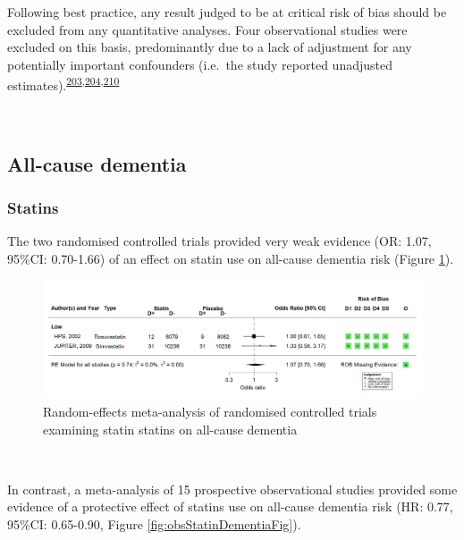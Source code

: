 \documentclass[a4paper, twoside]{templates/ociamthesis}
\begin{document}
Following best practice, any result judged to be at critical risk of bias should be excluded from any quantitative analyses. Four observational studies were excluded on this basis, predominantly due to a lack of adjustment for any potentially important confounders (i.e.~the study reported unadjusted estimates).\textsuperscript{\protect\hyperlink{ref-kuo2015}{203},\protect\hyperlink{ref-mainousa.g.2005}{204},\protect\hyperlink{ref-notkola1998}{210}}

~

\hypertarget{sys-rev-res-Dementia}{%
\subsection{All-cause dementia}\label{sys-rev-res-Dementia}}

\hypertarget{statins}{%
\subsubsection{Statins}\label{statins}}

The two randomised controlled trials provided very weak evidence (OR: 1.07, 95\%CI: 0.70-1.66) of an effect on statin use on all-cause dementia risk (Figure \ref{fig:rctStatinDementiaFig}).





\begin{figure}[H]
\includegraphics[width=1\linewidth]{figures/sys-rev/fp_rct_statins_Dementia} \caption[Random-effects meta-analysis of statins on all-cause dementia]{Random-effects meta-analysis of randomised controlled trials examining statin statins on all-cause dementia}\label{fig:rctStatinDementiaFig}
\end{figure}

~

In contrast, a meta-analysis of 15 prospective observational studies provided some evidence of a protective effect of statins use on all-cause dementia risk (HR: 0.77, 95\%CI: 0.65-0.90, Figure \ref{fig:obsStatinDementiaFig}).
\end{document}
